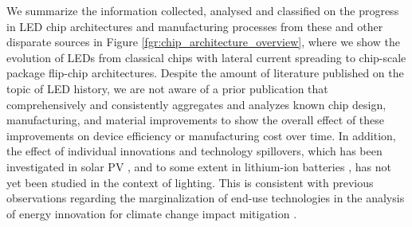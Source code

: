 \documentclass[twoside,twocolumn,9pt]{article}
\begin{document}
We summarize the information collected, analysed and classified on the progress in LED chip architectures and manufacturing processes from these and other disparate sources in Figure \ref{fgr:chip_architecture_overview}, where we show the evolution of LEDs from classical chips with lateral current spreading to chip-scale package flip-chip architectures. Despite the amount of literature published on the topic of LED history, we are not aware of a prior publication that comprehensively and consistently aggregates and analyzes known chip design, manufacturing, and material improvements to show the overall effect of these improvements on device efficiency or manufacturing cost over time. In addition, the effect of individual innovations and technology spillovers, which has been investigated in solar PV \cite{kavlak2018evaluating}\cite{kolesnikov2020novel}\cite{nemet2019solar}, and to some extent in lithium-ion batteries \cite{Stephan2021}, has not yet been studied in the context of lighting. This is consistent with previous observations regarding the marginalization of end-use technologies in the analysis of energy innovation for climate change impact mitigation \cite{Wilson2012}\cite{Creutzig2018}.
\end{document}
